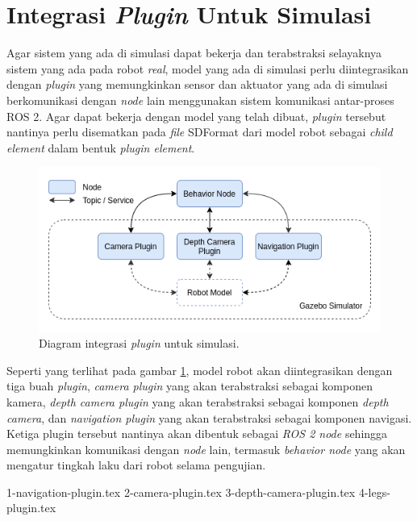 \section{Integrasi \emph{Plugin} Untuk Simulasi}
\label{sec:integrasiplugin}

Agar sistem yang ada di simulasi dapat bekerja dan terabstraksi selayaknya sistem yang ada pada robot \emph{real},
  model yang ada di simulasi perlu diintegrasikan dengan \emph{plugin} yang memungkinkan sensor dan aktuator yang ada di simulasi berkomunikasi dengan \emph{node} lain menggunakan sistem komunikasi antar-proses ROS 2.
  Agar dapat bekerja dengan model yang telah dibuat, \emph{plugin} tersebut nantinya perlu disematkan pada \emph{file} SDFormat dari model robot sebagai \emph{child element} dalam bentuk \emph{plugin element}.

\begin{figure} [ht]
  \centering
  \includegraphics[scale=0.5]{gambar/integrasi-plugin-simulasi.png}
  \caption{Diagram integrasi \emph{plugin} untuk simulasi.}
  \label{fig:integrasipluginsimulasi}
\end{figure}

Seperti yang terlihat pada gambar \ref{fig:integrasipluginsimulasi},
  model robot akan diintegrasikan dengan tiga buah \emph{plugin},
  \emph{camera plugin} yang akan terabstraksi sebagai komponen kamera,
  \emph{depth camera plugin} yang akan terabstraksi sebagai komponen \emph{depth camera},
  dan \emph{navigation plugin} yang akan terabstraksi sebagai komponen navigasi.
Ketiga plugin tersebut nantinya akan dibentuk sebagai \emph{ROS 2 node} sehingga memungkinkan komunikasi dengan \emph{node} lain,
  termasuk \emph{behavior node} yang akan mengatur tingkah laku dari robot selama pengujian.

{1-navigation-plugin.tex}
{2-camera-plugin.tex}
{3-depth-camera-plugin.tex}
{4-legs-plugin.tex}
